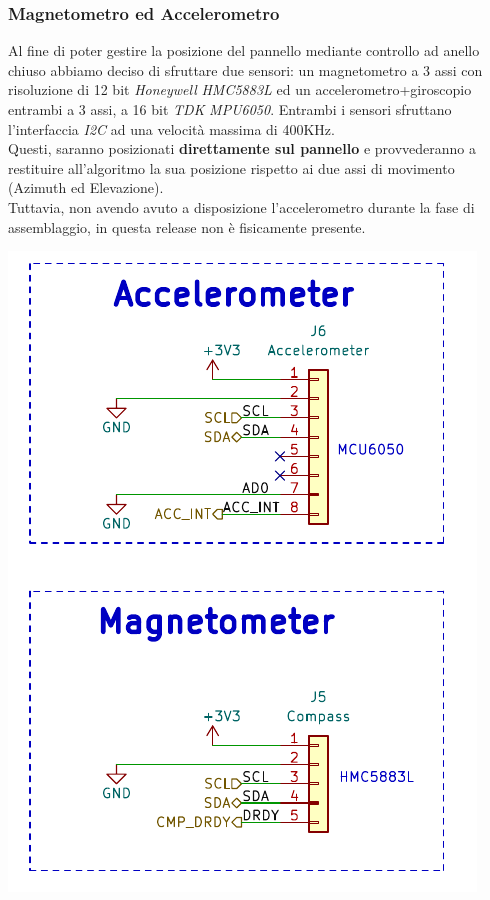\hypertarget{magnetometro-ed-accelerometro}{%
\subsubsection{\texorpdfstring{\hfill\break
Magnetometro ed Accelerometro\\
}{ Magnetometro ed Accelerometro }}\label{magnetometro-ed-accelerometro}}

Al fine di poter gestire la posizione del pannello mediante controllo ad
anello chiuso abbiamo deciso di sfruttare due sensori: un magnetometro a
3 assi con risoluzione di 12 bit \emph{Honeywell} \emph{HMC5883L} ed un
accelerometro+giroscopio entrambi a 3 assi, a 16 bit \emph{TDK}
\emph{MPU6050}. Entrambi i sensori sfruttano l'interfaccia \emph{I2C} 
ad una velocità massima di 400KHz.\\
Questi, saranno posizionati \textbf{direttamente sul pannello} e
provvederanno a restituire all'algoritmo la sua posizione
rispetto ai due assi di movimento (Azimuth ed Elevazione).\\
Tuttavia, non avendo avuto a disposizione l'accelerometro durante la
fase di assemblaggio, in questa release non è fisicamente presente.

\begin{center}
\includegraphics[scale=0.6]{figures/image31.png}
\captionsetup{type=figure}
\end{center}

